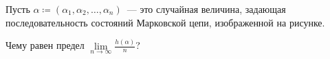 Пусть $\alpha \coloneqq (\alpha_1, \alpha_2, \dots, \alpha_n)$~--- это случайная величина, задающая
последовательность состояний Марковской цепи, изображенной на рисунке.

Чему равен предел $\lim\limits_{n \to \infty} \frac{h(\alpha)}{n}$?